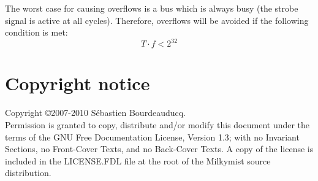 \documentclass[a4paper,11pt]{article}
\begin{document}
The worst case for causing overflows is a bus which is always busy (the strobe signal is active at all cycles). Therefore, overflows will be avoided if the following condition is met:
\[
T \cdot f < 2^{32}
\]

\section*{Copyright notice}
Copyright \copyright 2007-2010 S\'ebastien Bourdeauducq. \\
Permission is granted to copy, distribute and/or modify this document under the terms of the GNU Free Documentation License, Version 1.3; with no Invariant Sections, no Front-Cover Texts, and no Back-Cover Texts. A copy of the license is included in the LICENSE.FDL file at the root of the Milkymist source distribution.
\end{document}
